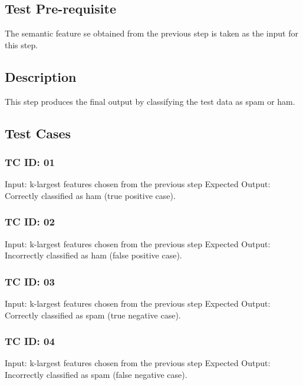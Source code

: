 \subsection{Test Pre-requisite}
The semantic feature se obtained from the previous step is taken as the input for this step.
\subsection{Description}
This step produces the final output by classifying the test data as spam or ham.
\subsection{Test Cases} 
\subsubsection{TC ID: 01}
Input: k-largest features chosen from the previous step
Expected Output: Correctly classified as ham (true positive case).
\subsubsection{TC ID: 02}
Input: k-largest features chosen from the previous step
Expected Output: Incorrectly classified as ham (false positive case).
\subsubsection{TC ID: 03}
Input: k-largest features chosen from the previous step
Expected Output: Correctly classified as spam (true negative case).
\subsubsection{TC ID: 04}
Input: k-largest features chosen from the previous step
Expected Output: Incorrectly classified as spam (false negative case).






